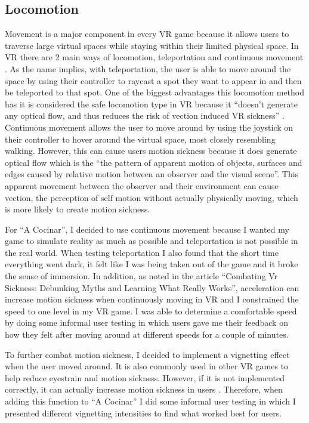 \documentclass[10pt,twocolumn]{article}
\begin{document}
\subsection{Locomotion}
Movement is a major component in every VR game because it allows users to traverse large virtual spaces while staying within their limited physical space. In VR there are 2 main ways of locomotion, teleportation and continuous movement \cite{teleportVRs2021}. As the name implies, with teleportation, the user is able to move around the space by using their controller to raycast a spot they want to appear in and then be teleported to that spot. One of the biggest advantages this locomotion method has it is considered the safe locomotion type in VR because it “doesn’t generate any optical flow, and thus reduces the risk of vection induced VR sickness” \cite{teleportOF2018}. Continuous movement allows the user to move around by using the joystick on their controller to hover around the virtual space, most closely resembling walking. However, this can cause users motion sickness because it does generate optical flow which is the “the pattern of apparent motion of objects, surfaces and edges caused by relative motion between an observer and the visual scene”\cite{teleportOF2018}. This apparent movement between the observer and their environment can cause vection, the perception of self motion without actually physically moving, which is more likely to create motion sickness. \par
For “A Cocinar”, I decided to use continuous movement because I wanted my game to simulate reality as much as possible and teleportation is not possible in the real world. When testing teleportation I also found that the short time everything went dark, it felt like I was being taken out of the game and it broke the sense of immersion. In addition, as noted in the article “Combating Vr Sickness: Debunking Myths and Learning What Really Works”, acceleration can increase motion sickness when continuously moving in VR and I constrained the speed to one level in my VR game\cite{vrSickness2018}. I was able to determine a comfortable speed by doing some informal user testing in which users gave me their feedback on how they felt after moving around at different speeds for a couple of minutes.  \par
To further combat motion sickness, I decided to implement a vignetting effect when the user moved around. It is also commonly used in other VR games to help reduce eyestrain and motion sickness. However, if it is not implemented correctly, it can actually increase motion sickness in users \cite{vignette2018}. Therefore, when adding this function to “A Cocinar” I did some informal user testing in which I presented different vignetting intensities to find what worked best for users.
\end{document}

